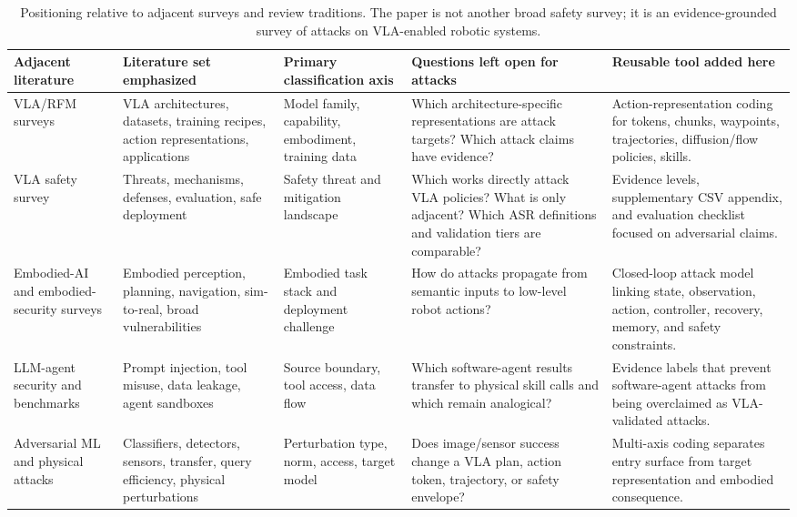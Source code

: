 \begin{table}[t]
\centering
\footnotesize
\caption{Positioning relative to adjacent surveys and review traditions. The paper is not another broad safety survey; it is an evidence-grounded survey of attacks on VLA-enabled robotic systems.}
\label{tab:positioning}
\renewcommand{\arraystretch}{1.13}
\setlength{\tabcolsep}{2.2pt}
\begin{tabularx}{\textwidth}{@{}p{}Y Y Y Y@{}}
\toprule
\textbf{Adjacent literature} & \textbf{Literature set emphasized} & \textbf{Primary classification axis} & \textbf{Questions left open for attacks} & \textbf{Reusable tool added here} \\
\midrule
VLA/RFM surveys \cite{sapkota2025vlasurvey} & VLA architectures, datasets, training recipes, action representations, applications & Model family, capability, embodiment, training data & Which architecture-specific representations are attack targets? Which attack claims have evidence? & Action-representation coding for tokens, chunks, waypoints, trajectories, diffusion/flow policies, skills. \\
\addlinespace
VLA safety survey \cite{li2026vlasafety} & Threats, mechanisms, defenses, evaluation, safe deployment & Safety threat and mitigation landscape & Which works directly attack VLA policies? What is only adjacent? Which ASR definitions and validation tiers are comparable? & Evidence levels, supplementary CSV appendix, and evaluation checklist focused on adversarial claims. \\
\addlinespace
Embodied-AI and embodied-security surveys \cite{liu2025embodiedsurvey,xing2025robustsecure} & Embodied perception, planning, navigation, sim-to-real, broad vulnerabilities & Embodied task stack and deployment challenge & How do attacks propagate from semantic inputs to low-level robot actions? & Closed-loop attack model linking state, observation, action, controller, recovery, memory, and safety constraints. \\
\addlinespace
LLM-agent security and benchmarks \cite{greshake2023not,ruan2024toolemu,debenedetti2024agentdojo,zhan2024injecagent} & Prompt injection, tool misuse, data leakage, agent sandboxes & Source boundary, tool access, data flow & Which software-agent results transfer to physical skill calls and which remain analogical? & Evidence labels that prevent software-agent attacks from being overclaimed as VLA-validated attacks. \\
\addlinespace
Adversarial ML and physical attacks \cite{szegedy2014intriguing,eykholt2018robust,tu2020lidar,cao2021invisible} & Classifiers, detectors, sensors, transfer, query efficiency, physical perturbations & Perturbation type, norm, access, target model & Does image/sensor success change a VLA plan, action token, trajectory, or safety envelope? & Multi-axis coding separates entry surface from target representation and embodied consequence. \\

\end{tabularx}
\end{table}
